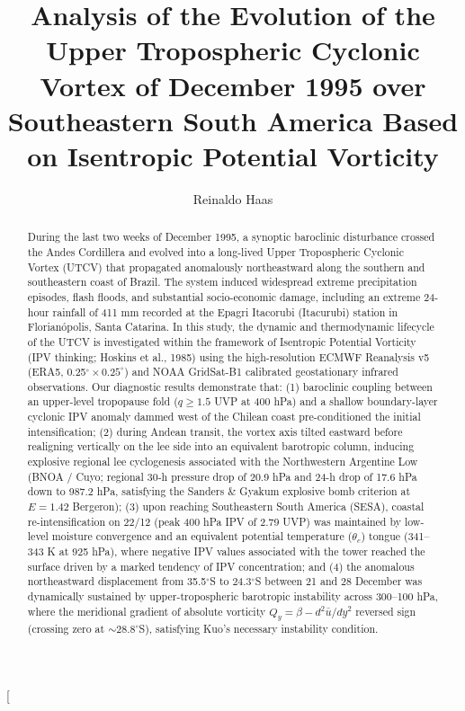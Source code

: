 \documentclass[twocolumn,a4paper,10pt]{article}
\title{Analysis of the Evolution of the Upper Tropospheric Cyclonic Vortex of December 1995 over Southeastern South America Based on Isentropic Potential Vorticity}
\author{Reinaldo Haas}
\affil{Department of Physics, Center for Physical and Mathematical Sciences, Federal University of Santa Catarina (UFSC), Florian\'opolis - SC, Brazil \\ Contact: reinaldo.haas@ufsc.br}
\date{}
\begin{document}
\twocolumn[
  \begin{@twocolumnfalse}
    \maketitle
    \begin{abstract}
During the last two weeks of December 1995, a synoptic baroclinic disturbance crossed the Andes Cordillera and evolved into a long-lived Upper Tropospheric Cyclonic Vortex (UTCV) that propagated anomalously northeastward along the southern and southeastern coast of Brazil. The system induced widespread extreme precipitation episodes, flash floods, and substantial socio-economic damage, including an extreme 24-hour rainfall of 411 mm recorded at the Epagri Itacorubi (Itacurubi) station in Florianópolis, Santa Catarina. In this study, the dynamic and thermodynamic lifecycle of the UTCV is investigated within the framework of Isentropic Potential Vorticity (IPV thinking; Hoskins et al., 1985) using the high-resolution ECMWF Reanalysis v5 (ERA5, 0.25$^\circ \times 0.25^\circ$) and NOAA GridSat-B1 calibrated geostationary infrared observations. Our diagnostic results demonstrate that: (1) baroclinic coupling between an upper-level tropopause fold ($q \ge 1.5$ UVP at 400 hPa) and a shallow boundary-layer cyclonic IPV anomaly dammed west of the Chilean coast pre-conditioned the initial intensification; (2) during Andean transit, the vortex axis tilted eastward before realigning vertically on the lee side into an equivalent barotropic column, inducing explosive regional lee cyclogenesis associated with the Northwestern Argentine Low (BNOA / Cuyo; regional 30-h pressure drop of 20.9 hPa and 24-h drop of 17.6 hPa down to 987.2 hPa, satisfying the Sanders \& Gyakum explosive bomb criterion at $E = 1.42$ Bergeron); (3) upon reaching Southeastern South America (SESA), coastal re-intensification on 22/12 (peak 400 hPa IPV of 2.79 UVP) was maintained by low-level moisture convergence and an equivalent potential temperature ($\theta_e$) tongue (341--343 K at 925 hPa), where negative IPV values associated with the tower reached the surface driven by a marked tendency of IPV concentration; and (4) the anomalous northeastward displacement from 35.5$^\circ$S to 24.3$^\circ$S between 21 and 28 December was dynamically sustained by upper-tropospheric barotropic instability across 300--100 hPa, where the meridional gradient of absolute vorticity $Q_y = \beta - d^2\bar{u}/dy^2$ reversed sign (crossing zero at $\sim 28.8^\circ$S), satisfying Kuo's necessary instability condition.

\end{abstract}
\end{@twocolumnfalse}
\end{document}

